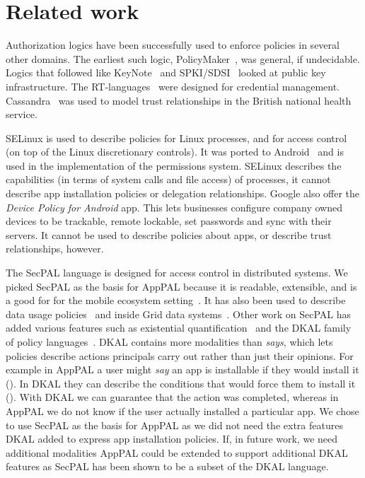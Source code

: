 \documentclass[]{llncs}
\newcommand{\citep}[1]{\cite{#1}}
\begin{document}
\section{Related work}

Authorization logics have been successfully used to enforce policies in several other domains.
The earliest such logic, PolicyMaker~\cite{Blaze:dj}, was general, if undecidable.
Logics that followed like KeyNote~\cite{Blaze:1999fa} and SPKI/SDSI~\cite{Ellison:1999ui} looked at public key infrastructure.
The RT-languages~\cite{Li:2002if} were designed for credential management.
Cassandra~\cite{Becker:2004fi} was used to model trust relationships in the British national health service.

SELinux is used to describe policies for Linux processes, and for access control (on top of the Linux discretionary controls).
It was ported to Android~\cite{Smalley:2013vl} and is used in the implementation of the permissions system.
SELinux describes the capabilities (in terms of system calls and file access) of processes, it cannot describe app installation policies or delegation relationships.
Google also offer the \emph{Device Policy for Android} app.
This lets businesses configure company owned devices to be trackable, remote lockable, set passwords and sync with their servers.
It cannot be used to describe policies about apps, or describe trust relationships, however.

The SecPAL language is designed for access control in distributed systems.
We picked SecPAL as the basis for AppPAL because it is readable, extensible, and is a good for for the mobile ecosystem setting~\citep{Hallett:2014un}.
It has also been used to describe data usage policies~\cite{Aziz:2011vt} and inside Grid data systems~\cite{Humphrey:2007wc}.
Other work on SecPAL has added various features such as existential quantification~\cite{Becker:2009vt} and the DKAL family of policy languages~\cite{Gurevich:2008fz,Gurevich:Qo5E3M3}.
DKAL contains more modalities than \emph{says}, which lets policies describe actions principals carry out rather than just their opinions.
For example in AppPAL a user might \emph{say} an app is installable if they would install it ().
In DKAL they can describe the conditions that would force them to install it ().
With DKAL we can guarantee that the action was completed, whereas in AppPAL we do not know if the user actually installed a particular app.
We chose to use SecPAL as the basis for AppPAL as we did not need the extra features DKAL added to express app installation policies.
If, in future work, we need additional modalities AppPAL could be extended to support additional DKAL features as SecPAL has been shown to be a subset of the DKAL language.
\end{document}
